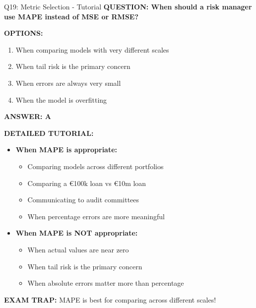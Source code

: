 \documentclass[8pt]{beamer}
\begin{document}
	\begin{frame}{Q19: Metric Selection - Tutorial}
		\fontsize{6.5}{7.5}\selectfont
		\textbf{QUESTION: When should a risk manager use MAPE instead of MSE or RMSE?}
		
		\vspace{0.1cm}
		\textbf{OPTIONS:}
		\begin{enumerate}
			\item When comparing models with very different scales
			\item When tail risk is the primary concern
			\item When errors are always very small
			\item When the model is overfitting
		\end{enumerate}
		
		\vspace{0.1cm}
		\textcolor{myblue}{\textbf{ANSWER: A}}
		
		\vspace{0.1cm}
		\textbf{DETAILED TUTORIAL:}
		\begin{itemize}
			\item \textbf{When MAPE is appropriate:}
			\begin{itemize}
				\item Comparing models across different portfolios
				\item Comparing a €100k loan vs €10m loan
				\item Communicating to audit committees
				\item When percentage errors are more meaningful
			\end{itemize}
			\item \textbf{When MAPE is NOT appropriate:}
			\begin{itemize}
				\item When actual values are near zero
				\item When tail risk is the primary concern
				\item When absolute errors matter more than percentage
			\end{itemize}
		\end{itemize}
		
		\textcolor{myred}{\textbf{EXAM TRAP:}} MAPE is best for \textcolor{myblue}{comparing across different scales}!
	\end{frame}
	
\end{document}
